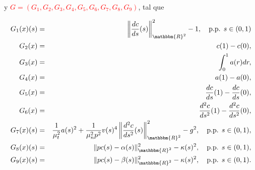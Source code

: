 \documentclass[10pt,mathserif]{beamer}
\newcommand{\R}{\mathbbm{R}}
\begin{document}
\begin{frame}
y \textcolor{red}{$G=(G_1,G_2,G_3,G_4,G_5,G_6,G_7,G_8,G_9)$}, tal que
\begin{small}
\begin{eqnarray*}
 G_1(x)(s)&=&\left\|\frac{dc}{ds}(s)\right\|_{\R^2}^2-1,\quad \mbox{p.p. }s\in(0,1)\\
 G_2(x)&=&c(1)-c(0),\\
 G_3(x)&=&\int_{0}^{1} a(r)dr,\\
 G_4(x)&=&a(1)-a(0),\\
 G_5(x)&=&\frac{dc}{ds}(1)-\frac{dc}{ds}(0),\\
 G_6(x)&=&\frac{d^2c}{ds^2}(1)-\frac{d^2c}{ds^2}(0),\\
 G_7(x)(s)&=&\frac{1}{\mu_t^2} a(s)^2 + \frac{1}{\mu_n^2 p^2}v(s)^4\left\| \frac{d^2 c}{ds^2}(s) \right\|_{\R^2}^2-g^2,\quad \mbox{p.p. }s\in(0,1),\\
 G_8(x)(s)&=&\|pc(s)-\alpha(s)\|_{\R^2}^2-\kappa(s)^2, \quad \mbox{p.p. }s\in(0,1),\\
 G_9(x)(s)&=&\|pc(s)-\beta(s)\|_{\R^2}^2-\kappa(s)^2, \quad \mbox{p.p. }s\in(0,1).
\end{eqnarray*}
\end{small}
\end{frame}
%  
% 
% 
% 
% 
% 
\end{document}
